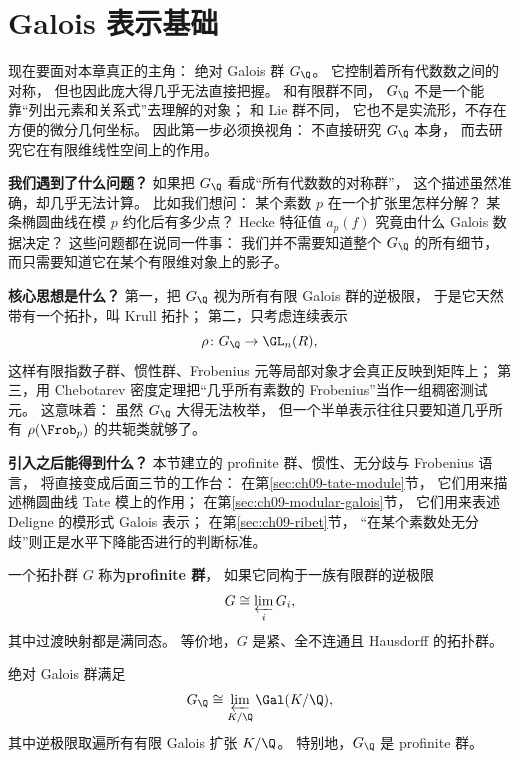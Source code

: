 \section{Galois 表示基础}
\label{sec:ch09-galois-representations}

\providecommand{\Zl}{\mathbb{Z}_\ell}
\providecommand{\Ql}{\mathbb{Q}_\ell}
\providecommand{\rhobar}{\bar{\rho}}

现在要面对本章真正的主角：
绝对 Galois 群 $G_\Q$。
它控制着所有代数数之间的对称，
但也因此庞大得几乎无法直接把握。
和有限群不同，
$G_\Q$ 不是一个能靠“列出元素和关系式”去理解的对象；
和 Lie 群不同，
它也不是实流形，不存在方便的微分几何坐标。
因此第一步必须换视角：
不直接研究 $G_\Q$ 本身，
而去研究它在有限维线性空间上的作用。

\textbf{我们遇到了什么问题？}
如果把 $G_\Q$ 看成“所有代数数的对称群”，
这个描述虽然准确，却几乎无法计算。
比如我们想问：
某个素数 $p$ 在一个扩张里怎样分解？
某条椭圆曲线在模 $p$ 约化后有多少点？
Hecke 特征值 $a_p(f)$ 究竟由什么 Galois 数据决定？
这些问题都在说同一件事：
我们并不需要知道整个 $G_\Q$ 的所有细节，
而只需要知道它在某个有限维对象上的影子。

\textbf{核心思想是什么？}
第一，把 $G_\Q$ 视为所有有限 Galois 群的逆极限，
于是它天然带有一个拓扑，叫 Krull 拓扑；
第二，只考虑连续表示
\[
  \rho\colon G_\Q\to \GL_n(R),
\]
这样有限指数子群、惯性群、Frobenius 元等局部对象才会真正反映到矩阵上；
第三，用 Chebotarev 密度定理把“几乎所有素数的 Frobenius”当作一组稠密测试元。
这意味着：
虽然 $G_\Q$ 大得无法枚举，
但一个半单表示往往只要知道几乎所有 $\rho(\Frob_p)$ 的共轭类就够了。

\textbf{引入之后能得到什么？}
本节建立的 profinite 群、惯性、无分歧与 Frobenius 语言，
将直接变成后面三节的工作台：
在第\ref{sec:ch09-tate-module}节，
它们用来描述椭圆曲线 Tate 模上的作用；
在第\ref{sec:ch09-modular-galois}节，
它们用来表述 Deligne 的模形式 Galois 表示；
在第\ref{sec:ch09-ribet}节，
“在某个素数处无分歧”则正是水平下降能否进行的判断标准。



\begin{definition}[profinite 群]
一个拓扑群 $G$ 称为\textbf{profinite 群}，
如果它同构于一族有限群的逆极限
\[
  G\cong \varprojlim_i G_i,
\]
其中过渡映射都是满同态。
等价地，$G$ 是紧、全不连通且 Hausdorff 的拓扑群。
\end{definition}

\begin{proposition}
\label{prop:ch09-gq-profinite}
绝对 Galois 群满足
\[
  G_\Q\cong \varprojlim_{K/\Q} \Gal(K/\Q),
\]
其中逆极限取遍所有有限 Galois 扩张 $K/\Q$。
特别地，$G_\Q$ 是 profinite 群。
\end{proposition}

